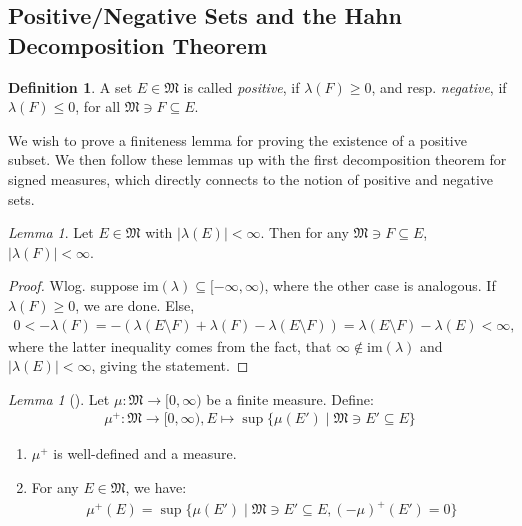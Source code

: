 \documentclass[10pt, leqno]{amsart}
\theoremstyle{definition}
\newtheorem{definition}{Definition}[section]
\theoremstyle{remark}
\newtheorem{lemma}[theorem]{Lemma}
\begin{document}
    \subsection{Positive/Negative Sets and the Hahn Decomposition Theorem}

    \begin{definition}
        A set \(E \in \mathfrak{M}\) is called \emph{positive}, if \(\lambda(F) \geq 0\), and resp. \emph{negative}, if \(\lambda(F) \leq 0\), for all \(\mathfrak{M} \ni F \subseteq E\).
    \end{definition}

    We wish to prove a finiteness lemma for proving the existence of a positive subset. We then follow these lemmas up with the first decomposition theorem for signed measures, which directly connects to the notion of positive and negative sets.

    \begin{lemma} \label{lem:finiteness_lemma}
        Let \(E \in \mathfrak{M}\) with \(|\lambda(E)| < \infty\). Then for any \(\mathfrak{M} \ni F \subseteq E\), \(|\lambda(F)| < \infty\).
    \end{lemma}

    \begin{proof}
        Wlog. suppose \(\text{im}(\lambda) \subseteq [-\infty, \infty)\), where the other case is analogous. If \(\lambda(F) \geq 0\), we are done. Else,
        \begin{align}
            0 < -\lambda(F) = -(\lambda(E \setminus F) + \lambda(F) - \lambda(E \setminus F)) = \lambda(E \setminus F) - \lambda(E) < \infty,
        \end{align}
        where the latter inequality comes from the fact, that \(\infty \notin \text{im}(\lambda)\) and \(|\lambda(E)| < \infty\), giving the statement.
    \end{proof}

    \begin{edgebox}
        \begin{lemma}[{\cite[pp. 59-60]{Fonseca}}] \label{lem:supremum_lemma}
            Let \(\mu\colon \mathfrak{M} \to [0, \infty)\) be a finite measure. Define:
            \begin{align}
                \mu^+\colon \mathfrak{M} \to [0, \infty), E \mapsto \sup\{\mu(E') \mid \mathfrak{M} \ni E' \subseteq E\}
            \end{align}
            \begin{enumerate}[label=(\roman*)]
                \item \(\mu^+\) is well-defined and a measure.
                \item For any \(E \in \mathfrak{M}\), we have:
                \begin{align}
                    \mu^+(E) = \sup\{\mu(E') \mid \mathfrak{M} \ni E' \subseteq E, (-\mu)^+(E') = 0\}
                \end{align}
            \end{enumerate}
        \end{lemma}
    \end{edgebox}
\end{document}
